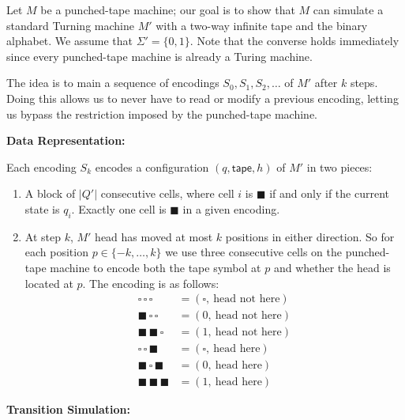 \documentclass[12pt]{article}
\begin{document}
\begin{solution}
    \bbni

    Let $M$ be a punched-tape machine; our goal is to show that $M$ can simulate a standard Turning machine $M'$ with a two-way infinite tape and the binary alphabet. We assume that $\Sigma' = \{0, 1\}$. Note that the converse holds immediately since every punched-tape machine is already a Turing machine.

    The idea is to main a sequence of encodings $S_0, S_1, S_2, \ldots$ of $M'$ after $k$ steps. Doing this allows us to never have to read or modify a previous encoding, letting us bypass the restriction imposed by the punched-tape machine. 

    \textbf{Data Representation:}

    Each encoding $S_k$ encodes a configuration $(q, \mathsf{tape}, h)$ of $M'$ in two pieces: 
    \begin{enumerate}
        \item A block of $|Q'|$ consecutive cells, where cell $i$ is $\blacksquare$ if and only if the current state is $q_i$. Exactly one cell is $\blacksquare$ in a given encoding.
        \item 
        
        At step $k$, $M'$ head has moved at most $k$ positions in either direction. So for each position $p \in \{-k, \ldots, k\}$  we use three consecutive cells on the punched-tape machine to encode both the tape symbol at $p$ and whether the head is located at $p$. The encoding is as follows:
        \begin{align*}
            \square\,\square\,\square &= (\square,\ \text{head not here}) \\
            \blacksquare\,\square\,\square &= (0,\ \text{head not here}) \\
            \blacksquare\,\blacksquare\,\square &= (1,\ \text{head not here}) \\
            \square\,\square\,\blacksquare &= (\square,\ \text{head here}) \\
            \blacksquare\,\square\,\blacksquare &= (0,\ \text{head here}) \\
            \blacksquare\,\blacksquare\,\blacksquare &= (1,\ \text{head here})
        \end{align*}

    \end{enumerate}


    \textbf{Transition Simulation:}


\end{solution}
\end{document}
